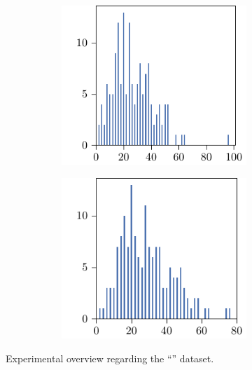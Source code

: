 \begin{figure}[p]
\begin{subfigure}{\textwidth}
\begin{subfigure}{\mymultiouter}
          \includegraphics[width=\mymultiinner]{figures/new/manhattan-rain_sydney-qlibra-retraining}
    \end{subfigure}
    \begin{subfigure}{\mymultiouter}
        \centering
          \includegraphics[width=\mymultiinner]{figures/new/manhattan-rain_sydney-permutation-retraining}
      \end{subfigure}
  \end{subfigure}
    \caption{Experimental overview regarding the ``\rain{}'' dataset.}
\end{figure}




